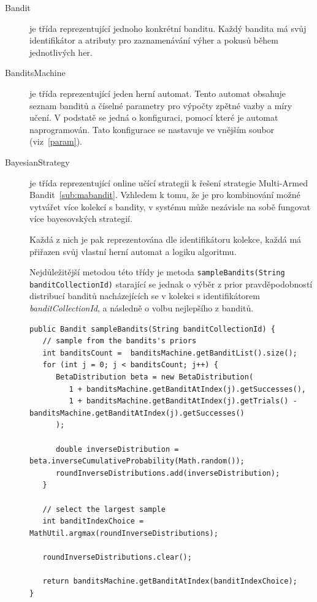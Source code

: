 \documentclass[thesis=M,czech]{FITthesis}[2014/05/07]
\begin{document}
\begin{description}
	\item[Bandit] je třída reprezentující jednoho konkrétní banditu. Každý bandita má svůj identifikátor a atributy pro zaznamenávání výher a pokusů během jednotlivých her.
	\item[BanditsMachine] je třída reprezentující jeden herní automat. Tento automat obsahuje seznam banditů a číselné parametry pro výpočty zpětné vazby a míry učení. V podstatě se jedná o konfiguraci, pomocí které je automat naprogramován. Tato konfigurace se nastavuje ve vnějším soubor (viz~\ref{param}).
	\item[BayesianStrategy]	je třída reprezentující online učící strategii k řešení strategie Multi-Armed Bandit~\ref{sub:mabandit}. Vzhledem k tomu, že je pro kombinování možné vytvářet více kolekcí s bandity, v systému může nezávisle na sobě fungovat více bayesovských strategií. 
	
	Každá z nich je pak reprezentována dle identifikátoru kolekce, každá má přiřazen svůj vlastní herní automat a logiku algoritmu.  
	
	Nejdůležitější metodou této třídy je metoda \texttt{sampleBandits(String banditCollectionId)} starající se jednak o výběr z prior pravděpodobností distribucí banditů nacházejících se v kolekci s identifikátorem \emph{banditCollectionId}, a následně o volbu nejlepšího z banditů. 
	
\begin{verbatim}
public Bandit sampleBandits(String banditCollectionId) {
   // sample from the bandits's priors
   int banditsCount =  banditsMachine.getBanditList().size();
   for (int j = 0; j < banditsCount; j++) {
      BetaDistribution beta = new BetaDistribution(
         1 + banditsMachine.getBanditAtIndex(j).getSuccesses(),
         1 + banditsMachine.getBanditAtIndex(j).getTrials() - banditsMachine.getBanditAtIndex(j).getSuccesses()
      );

      double inverseDistribution = beta.inverseCumulativeProbability(Math.random());
      roundInverseDistributions.add(inverseDistribution);
   }
        
   // select the largest sample     
   int banditIndexChoice = MathUtil.argmax(roundInverseDistributions);

   roundInverseDistributions.clear();
        
   return banditsMachine.getBanditAtIndex(banditIndexChoice);
}
\end{verbatim}	
	
\end{description}
\end{document}
